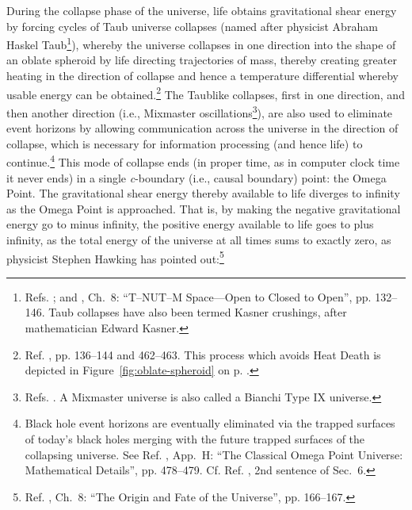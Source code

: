 \documentclass[letterpaper,12pt]{article}
\begin{document}
During the collapse phase of the universe, life obtains gravitational shear energy by forcing cycles of Taub universe collapses (named after physicist Abraham Haskel Taub\footnote{Refs. ; and , Ch.~8: ``T--NUT--M Space---Open to Closed to Open'', pp. 132--146. Taub collapses have also been termed Kasner crushings, after mathematician Edward Kasner.}), whereby the universe collapses in one direction into the shape of an oblate spheroid by life directing trajectories of mass, thereby creating greater heating in the direction of collapse and hence a temperature differential whereby usable energy can be obtained.\footnote{Ref. , pp. 136--144 and 462--463. This process which avoids Heat Death is depicted in Figure~\ref{fig:oblate-spheroid} on p. \pageref{fig:oblate-spheroid}.} The Taublike collapses, first in one direction, and then another direction (i.e., Mixmaster oscillations\footnote{Refs. . A Mixmaster universe is also called a Bianchi Type IX universe.}), are also used to eliminate event horizons by allowing communication across the universe in the direction of collapse, which is necessary for information processing (and hence life) to continue.\footnote{Black hole event horizons are eventually eliminated via the trapped surfaces of today's black holes merging with the future trapped surfaces of the collapsing universe. See Ref. , App.~H: ``The Classical Omega Point Universe: Mathematical Details'', pp. 478--479. Cf. Ref. , 2nd sentence of Sec.~6.} This mode of collapse ends (in proper time, as in computer clock time it never ends) in a single \emph{c}-boundary (i.e., causal boundary) point: the Omega Point. The gravitational shear energy thereby available to life diverges to infinity as the Omega Point is approached. That is, by making the negative gravitational energy go to minus infinity, the positive energy available to life goes to plus infinity, as the total energy of the universe at all times sums to exactly zero, as physicist Stephen Hawking has pointed out:\footnote{Ref. , Ch.~8: ``The Origin and Fate of the Universe'', pp. 166--167.}
\end{document}
